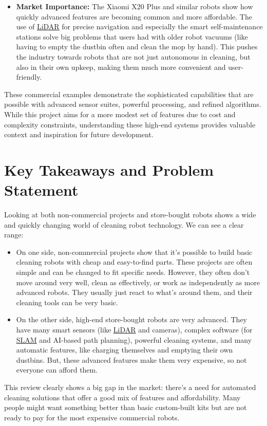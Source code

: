 \begin{itemize}
\begin{itemize}
        \end{itemize}
    \item \textbf{Market Importance:} The Xiaomi X20 Plus and similar robots show how quickly advanced features are becoming common and more affordable. The use of \hyperref[term:lidar]{LiDAR} for precise navigation and especially the smart self-maintenance stations solve big problems that users had with older robot vacuums (like having to empty the dustbin often and clean the mop by hand). This pushes the industry towards robots that are not just autonomous in cleaning, but also in their own upkeep, making them much more convenient and user-friendly.
\end{itemize}
These commercial examples demonstrate the sophisticated capabilities that are possible with advanced sensor suites, powerful processing, and refined algorithms. While this project aims for a more modest set of features due to cost and complexity constraints, understanding these high-end systems provides valuable context and inspiration for future development.

\section{Key Takeaways and Problem Statement}
\label{sec:takeaways_problem_lit}
Looking at both non-commercial projects and store-bought robots shows a wide and quickly changing world of cleaning robot technology. We can see a clear range:
\begin{itemize}
    \item On one side, non-commercial projects show that it's possible to build basic cleaning robots with cheap and easy-to-find parts. These projects are often simple and can be changed to fit specific needs. However, they often don't move around very well, clean as effectively, or work as independently as more advanced robots. They usually just react to what's around them, and their cleaning tools can be very basic.
    \item On the other side, high-end store-bought robots are very advanced. They have many smart sensors (like \hyperref[term:lidar]{LiDAR} and cameras), complex software (for \hyperref[term:slam]{SLAM} and AI-based path planning), powerful cleaning systems, and many automatic features, like charging themselves and emptying their own dustbins. But, these advanced features make them very expensive, so not everyone can afford them.
\end{itemize}
This review clearly shows a big gap in the market: there's a need for automated cleaning solutions that offer a good mix of features and affordability. Many people might want something better than basic custom-built kits but are not ready to pay for the most expensive commercial robots.

